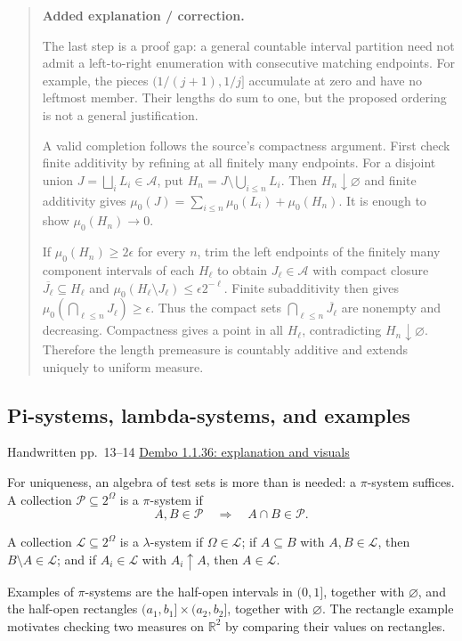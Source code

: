 \documentclass[11pt,letterpaper]{article}
\newcommand{\lecturesection}[1]{\subsection{#1}}
\begin{document}
\begin{quote}\small\textbf{Added explanation / correction.}

The last step is a proof gap: a general countable interval partition need not admit a left-to-right enumeration with consecutive matching endpoints. For example, the pieces $(1/(j+1),1/j]$ accumulate at zero and have no leftmost member. Their lengths do sum to one, but the proposed ordering is not a general justification.

A valid completion follows the source's compactness argument. First check finite additivity by refining at all finitely many endpoints. For a disjoint union $J=\bigsqcup_iL_i\in\mathcal A$, put $H_n=J\setminus\bigcup_{i\le n}L_i$. Then $H_n\downarrow\varnothing$ and finite additivity gives $\mu_0(J)=\sum_{i\le n}\mu_0(L_i)+\mu_0(H_n)$. It is enough to show $\mu_0(H_n)\to0$.

If $\mu_0(H_n)\ge2\epsilon$ for every $n$, trim the left endpoints of the finitely many component intervals of each $H_\ell$ to obtain $J_\ell\in\mathcal A$ with compact closure $\overline{J_\ell}\subseteq H_\ell$ and $\mu_0(H_\ell\setminus J_\ell)\le\epsilon2^{-\ell}$. Finite subadditivity then gives $\mu_0(\bigcap_{\ell\le n}J_\ell)\ge\epsilon$. Thus the compact sets $\bigcap_{\ell\le n}\overline{J_\ell}$ are nonempty and decreasing. Compactness gives a point in all $H_\ell$, contradicting $H_n\downarrow\varnothing$. Therefore the length premeasure is countably additive and extends uniquely to uniform measure.
\end{quote}

\hypertarget{l2-s3}{}
\lecturesection{Pi-systems, lambda-systems, and examples}
{\small\textcolor{lectureink}{Handwritten pp.\ 13--14} \quad \href{https://josephrbailey.com/probability/\#entry-1-1-36}{Dembo 1.1.36: explanation and visuals}}

For uniqueness, an algebra of test sets is more than is needed: a $\pi$-system suffices. A collection $\mathcal P\subseteq2^\Omega$ is a $\pi$-system if \[A,B\in\mathcal P\quad\Longrightarrow\quad A\cap B\in\mathcal P.\]

A collection $\mathcal L\subseteq2^\Omega$ is a $\lambda$-system if $\Omega\in\mathcal L$; if $A\subseteq B$ with $A,B\in\mathcal L$, then $B\setminus A\in\mathcal L$; and if $A_i\in\mathcal L$ with $A_i\uparrow A$, then $A\in\mathcal L$.

Examples of $\pi$-systems are the half-open intervals in $(0,1]$, together with $\varnothing$, and the half-open rectangles $(a_1,b_1]\times(a_2,b_2]$, together with $\varnothing$. The rectangle example motivates checking two measures on $\mathbb R^2$ by comparing their values on rectangles.
\end{document}
